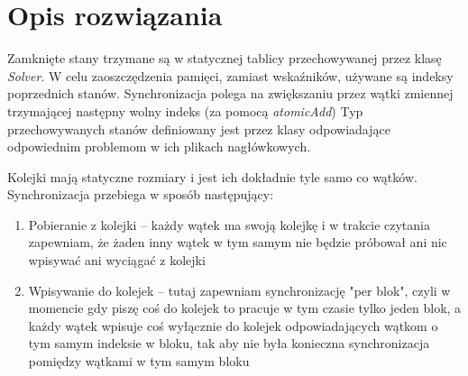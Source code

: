 \documentclass{article}
\begin{document}
\section{Opis rozwiązania}
Zamknięte stany trzymane są w statycznej tablicy przechowywanej przez klasę \emph{Solver}. 
W celu zaoszczędzenia pamięci, zamiast wskaźników, używane są indeksy poprzednich stanów.
Synchronizacja polega na zwiększaniu przez wątki zmiennej trzymającej następny wolny indeks (za pomocą \emph{atomicAdd})
Typ przechowywanych stanów definiowany jest przez klasy odpowiadające odpowiednim problemom w ich plikach nagłówkowych.

Kolejki mają statyczne rozmiary i jest ich dokładnie tyle samo co wątków. Synchronizacja przebiega w sposób następujący:
\begin{enumerate}
 \item Pobieranie z kolejki -- każdy wątek ma swoją kolejkę i w trakcie czytania zapewniam, że żaden inny wątek w tym samym nie będzie próbował
   ani nic wpisywać ani wyciągać z kolejki
 \item Wpisywanie do kolejek -- tutaj zapewniam synchronizację "per blok", czyli w momencie gdy piszę coś do kolejek to pracuje w tym czasie
  tylko jeden blok, a każdy wątek wpisuje coś wyłącznie do kolejek odpowiadających wątkom o tym samym indeksie w bloku, tak aby nie była konieczna
  synchronizacja pomiędzy wątkami w tym samym bloku
\end{enumerate}
\end{document}
